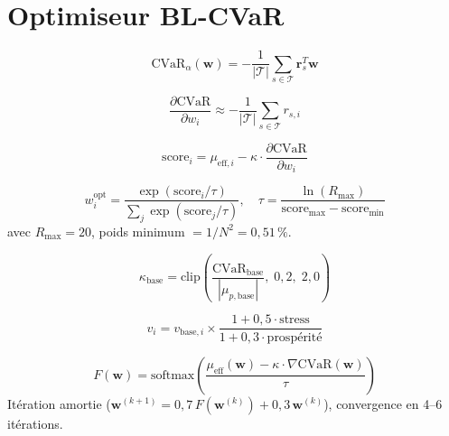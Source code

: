 \documentclass[10pt, a4paper, oneside]{report}
\theoremstyle{definition}
\begin{document}
\section{Optimiseur BL-CVaR}
\label{sec:annexe:blcvar}

\begin{equation}
\text{CVaR}_\alpha(\mathbf{w}) = -\frac{1}{|\mathcal{T}|} \sum_{s \in \mathcal{T}} \mathbf{r}_s^T \mathbf{w}
\label{eq:cvar-mc}
\end{equation}

\begin{equation}
\frac{\partial \text{CVaR}}{\partial w_i} \approx -\frac{1}{|\mathcal{T}|} \sum_{s \in \mathcal{T}} r_{s,i}
\label{eq:cvar-gradient}
\end{equation}

\begin{equation}
\text{score}_i = \mu_{\text{eff},i} - \kappa \cdot \frac{\partial \text{CVaR}}{\partial w_i}
\label{eq:blcvar-score}
\end{equation}

\begin{equation}
w_i^{\text{opt}} = \frac{\exp(\text{score}_i / \tau)}{\sum_j \exp(\text{score}_j / \tau)}, \quad \tau = \frac{\ln(R_{\max})}{\text{score}_{\max} - \text{score}_{\min}}
\label{eq:softmax-blcvar}
\end{equation}
avec $R_{\max} = 20$, poids minimum $= 1/N^2 = 0{,}51\,\%$.

\begin{equation}
\kappa_{\text{base}} = \text{clip}\!\left(\frac{\text{CVaR}_{\text{base}}}{|\mu_{p,\text{base}}|}, \; 0{,}2, \; 2{,}0\right)
\label{eq:kappa}
\end{equation}

\begin{equation}
v_i = v_{\text{base},i} \times \frac{1 + 0{,}5 \cdot \text{stress}}{1 + 0{,}3 \cdot \text{prospérité}}
\label{eq:vol-cyclique}
\end{equation}

\begin{equation}
F(\mathbf{w}) = \text{softmax}\!\left(\frac{\mu_{\text{eff}}(\mathbf{w}) - \kappa \cdot \nabla \text{CVaR}(\mathbf{w})}{\tau}\right)
\label{eq:fixedpoint}
\end{equation}
Itération amortie ($\mathbf{w}^{(k+1)} = 0{,}7\, F(\mathbf{w}^{(k)}) + 0{,}3\, \mathbf{w}^{(k)}$), convergence en 4--6 itérations.
\end{document}
